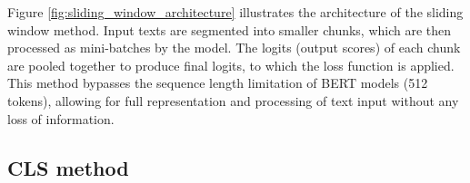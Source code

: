 Figure \ref{fig:sliding_window_architecture} illustrates the architecture of the sliding window method. Input texts are segmented into smaller chunks, which are then processed as mini-batches by the model. The logits (output scores) of each chunk are pooled together to produce final logits, to which the loss function is applied. This method bypasses the sequence length limitation of BERT models (512 tokens), allowing for full representation and processing of text input without any loss of information.

\begin{comment}
The complexity of this method is as follows:
\[
    O(L \cdot T \cdot H)
\]

where L is the sequence length, T is the number of transformer layers in the BERT model (typically 12), H is Hidden size of the BERT model (dimension of the transformer's feedforward networks, typically 768).
\end{comment}

\subsection{CLS method}


